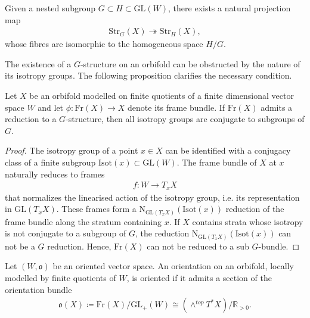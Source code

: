 \documentclass[psamsfonts]{amsart}
\theoremstyle{plain}
\theoremstyle{definition}{
\newtheorem{defi}{Definition}[section]
\newtheorem{ass}{Assumption}
\newtheorem*{nota}{Notation}}
\theoremstyle{remark}{
\newtheorem{rem}{Remark}
\newtheorem{ex}{Example}}
\theoremstyle{plain}{
\newtheorem{thm}{Theorem}[section]
\newtheorem{lem}{Lemma}[section]
\newtheorem{cor}{Corollary}[section]
\newtheorem{prop}{Proposition}[section]
\newtheorem{con}{Conjecture}[section]}
\newcommand{\m}[1]{{\mathrm{#1}}}
\begin{document}
\begin{lem}
    Given a nested subgroup $G\subset H\subset \m{GL}(W)$, there exists a natural projection map 
    \begin{align*}
        \m{Str}_G(X)\twoheadrightarrow \m{Str}_H (X),
    \end{align*}
    whose fibres are isomorphic to the homogeneous space $H/G$.
\end{lem}

The existence of a $G$-structure on an orbifold can be obstructed by the nature of its isotropy groups. The following proposition clarifies the necessary condition.

\begin{prop}
    Let $X$ be an orbifold modelled on finite quotients of a finite dimensional vector space $W$ and let $\phi\colon \m{Fr}(X)\rightarrow X$ denote its frame bundle. If $\m{Fr}(X)$ admits a reduction to a $G$-structure, then all isotropy groups are conjugate to subgroups of $G$.
\end{prop}

\begin{proof}
    The isotropy group of a point $x\in X$ can be identified with a conjugacy class of a finite subgroup $\m{Isot}(x)\subset \m{GL}(W)$. The frame bundle of $X$ at $x$ naturally reduces to frames  
    \begin{align*}
        f\colon W\rightarrow T_xX
    \end{align*}
    that normalizes the linearised action of the isotropy group, i.e. its representation in $\m{GL}(T_xX)$. These frames form a $\m{N}_{\m{GL}(T_xX)}(\m{Isot}(x))$ reduction of the frame bundle along the stratum containing $x$. If $X$ contains strata whose isotropy is not conjugate to a subgroup of $G$, the reduction $\m{N}_{\m{GL}(T_xX)}(\m{Isot}(x))$ can not be a $G$ reduction. Hence, $\m{Fr}(X)$ can not be reduced to a sub $G$-bundle.
\end{proof}





\begin{ex}
    Let $(W,\mathfrak{o})$ be an oriented vector space. An orientation on an orbifold, locally modelled by finite quotients of $W$, is oriented if it admits a section of the orientation bundle 
    \begin{align*}
        \mathfrak{o}(X)\coloneqq \m{Fr}(X)/\m{GL}_+(W)\cong (\wedge^{top}T^*X)/\mathbb{R}_{>0}.
    \end{align*}
\end{ex}
\end{document}
